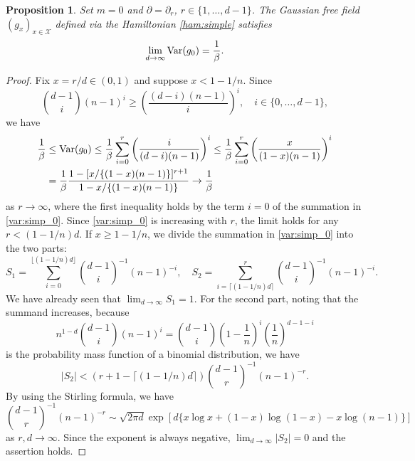 \documentclass[a4paper,11pt]{article}
\theoremstyle{plain}
\newtheorem{proposition}[theorem]{Proposition}
\theoremstyle{definition}
\begin{document}

\begin{proposition}\label{prop:cov:simp_0}
  Set $m=0$ and
  $\partial=\partial_r$, $r\in\{1,\ldots,d-1\}$.
  The Gaussian free field $(g_x)_{x\in\mathcal{X}}$
  defined via the Hamiltonian \eqref{ham:simple}
  satisfies
  \begin{equation}\label{prop:cov:simp_0:1}
    \lim_{d\to\infty}{\rm Var}(g_0)=\frac{1}{\beta}.
  \end{equation}
\end{proposition}

\begin{proof}
  Fix $x=r/d\in(0,1)$ and suppose $x<1-1/n$. Since
  \[
    {{d-1}\choose{i}} (n-1)^i \ge
    \left(\frac{(d-i)(n-1)}{i}\right)^i,
    \quad i\in\{0,\ldots,d-1\},
  \]
  we have
  \begin{align*}
    \frac{1}{\beta} &\le {\rm Var}(g_0)
    \le \frac{1}{\beta}\sum_{i=0}^r
    \left(\frac{i}{(d-i)(n-1)}\right)^i
    \le  
    \frac{1}{\beta}\sum_{i=0}^r
    \left(\frac{x}{(1-x)(n-1)}\right)^i\\
    &=\frac{1}{\beta}
    \frac{1-[x/\{(1-x)(n-1)\}]^{r+1}}
         {1-x/\{(1-x)(n-1)\}}
    \to\frac{1}{\beta}
  \end{align*}
  as $r\to\infty$, where the first inequality
  holds by the term $i=0$ of the summation
  in \eqref{var:simp_0}. Since \eqref{var:simp_0}
  is increasing with $r$, the limit holds for
  any $r<(1-1/n)d$. If $x\ge 1-1/n$, we divide
  the summation in \eqref{var:simp_0} into the two parts:
  \[
    S_1=\sum_{i=0}^{\lfloor (1-1/n)d\rfloor}
      {d-1\choose i}^{-1}(n-1)^{-i}, \quad
    S_2=\sum_{i=\lceil (1-1/n)d\rceil}^r
    {d-1\choose i}^{-1}(n-1)^{-i}.
  \]
  We have already seen that $\lim_{d\to\infty} S_1=1$.
  For the second part, noting that the summand increases,
  because
  \[
  n^{1-d}{d-1\choose i}(n-1)^i=
  \binom{d-1}{i}\left(1-\frac{1}{n}\right)^i
  \left(\frac{1}{n}\right)^{d-1-i}
  \]
  is the probability mass function of a binomial
  distribution, we have
  \[
    |S_2|<(r+1-\lceil(1-1/n)d\rceil)
    {d-1 \choose r}^{-1}(n-1)^{-r}.
  \]
  By using the Stirling formula, we have
  \[
    {d-1 \choose r}^{-1}(n-1)^{-r}\sim
    \sqrt{2\pi d}
    \exp\left[d\{x\log x+(1-x)\log(1-x)-x\log(n-1)\}\right]
  \]
  as $r,d\to\infty$. Since the exponent is
  always negative, $\lim_{d\to\infty}|S_2|=0$
  and the assertion holds.
\end{proof}
\end{document}
